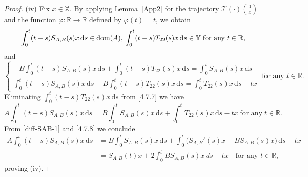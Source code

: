\documentclass[11pt]{amsart}
\numberwithin{equation}{section}
\newcommand{\SAB}{S_{A,B}}
\newcommand{\RR}{{\mathbb R}}
\newcommand{\rmd}{{\mathrm{d}}}
\theoremstyle{remark}
\theoremstyle{definition}
\newcommand\cT{{\mathcal T}}
\newcommand\bX{{\mathbb X}}
\newcommand\bY{{\mathbb Y}}
\newcommand{\dom}{\text{\rm{dom}}}
\begin{document}
\begin{proof}
	(iv) Fix $x \in\bX$. By applying Lemma~\ref{App2} for the trajectory $\cT(\cdot)\binom{0}{x} $ and the function $\varphi:\RR\to\RR$ defined by $\varphi(t)=t$, we obtain
	\begin{equation}\label{4.7.6}
		\int_0^t (t-s)\SAB(s)x \, \rmd s \in \dom(A),\,\int_0^t (t-s)T_{22}(s)x \, \rmd s \in \bY
		\; \text{for any}\; t \in \mathbb{R},
	\end{equation}
	and
	\begin{equation}\label{4.7.7}
		\begin{cases}
			\displaystyle -B\int_0^t (t-s)\SAB(s)x \, \rmd s + \int_0^t (t-s) T_{22}(s)x \, \rmd s
			= \int_0^t \SAB(s)x \, \rmd s \\
			\displaystyle \int_0^t (t-s)\SAB(s)x \, \rmd s - B\int_0^t (t-s)T_{22}(s)x \, \rmd s
			= \int_0^t T_{22}(s)x \, \rmd s - tx
		\end{cases}\; \text{for any}\; t \in \mathbb{R}.
	\end{equation}
	Eliminating $\displaystyle\int_0^t (t-s) T_{22}(s)x \, \rmd s$ from \eqref{4.7.7} we have
	\begin{equation}\label{4.7.8}
		A\int_0^t (t-s)\SAB(s)x \, \rmd s
		= B\int_0^t \SAB(s)x \, \rmd s + \int_0^t T_{22}(s)x \, \rmd s - tx\; \text{for any}\; t \in \mathbb{R}.
	\end{equation}
	From \eqref{diff-SAB-1} and \eqref{4.7.8} we conclude
	\begin{align}\label{4.7.9}
		A\int_0^t (t-s)\SAB(s)x \, \rmd s
		&= B\int_0^t \SAB(s)x \, \rmd s
		+ \int_0^t \bigl(\SAB'(s)x + B\SAB(s)x\bigr) \, \rmd s - tx\nonumber\\
		&= \SAB(t)x + 2\int_0^t B\SAB(s)x \, ds - tx
		\quad \text{for any } t \in \mathbb{R},
	\end{align}
	proving (iv).
	

\end{proof}
\end{document}
